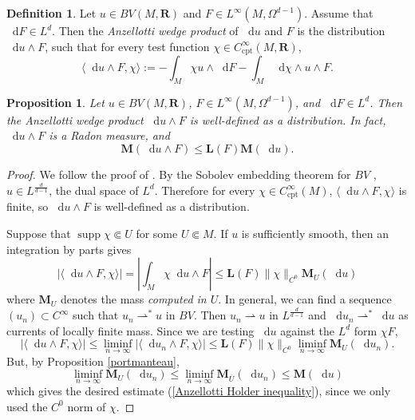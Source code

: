 \documentclass[reqno,11pt]{amsart}
\newcommand{\RR}{\mathbf{R}}
\newcommand*\dif{\mathop{}\!\mathrm{d}}
\DeclareMathOperator{\supp}{supp}
\newcommand{\weakto}{\rightharpoonup}
\newcommand{\Mass}{\mathbf M}
\newcommand{\Comass}{\mathbf L}
\newcommand{\dfn}[1]{\emph{#1}\index{#1}}
\newcommand{\cpt}{\mathrm{cpt}}
\newtheorem{proposition}[theorem]{Proposition}
\theoremstyle{definition}
\newtheorem{definition}[theorem]{Definition}
\numberwithin{equation}{section}
\begin{document}
\begin{definition}
Let $u \in BV(M, \RR)$ and $F \in L^\infty(M, \Omega^{d - 1})$.
Assume that $\dif F \in L^d$.
Then the \dfn{Anzellotti wedge product} of $\dif u$ and $F$ is the distribution $\dif u \wedge F$, such that for every test function $\chi \in C^\infty_\cpt(M, \RR)$,
$$\langle \dif u \wedge F, \chi\rangle := -\int_M \chi u \wedge \dif F - \int_M \dif \chi \wedge u \wedge F.$$
\end{definition}

\begin{proposition}\label{Anzellotti wedge product exists}
Let $u \in BV(M, \RR)$, $F \in L^\infty(M, \Omega^{d - 1})$, and $\dif F \in L^d$.
Then the Anzellotti wedge product $\dif u \wedge F$ is well-defined as a distribution.
In fact, $\dif u \wedge F$ is a Radon measure, and 
\begin{equation}\label{Anzellotti Holder inequality}
\Mass(\dif u \wedge F) \leq \Comass(F) \Mass(\dif u).
\end{equation}
\end{proposition}
\begin{proof}
We follow the proof of \cite[Theorem 1.5]{Anzellotti1983}.
By the Sobolev embedding theorem for $BV$ \cite[\S5.6]{evans2015measure}, $u \in L^{\frac{d}{d - 1}}$, the dual space of $L^d$.
Therefore for every $\chi \in C^\infty_\cpt(M)$, $\langle \dif u \wedge F, \chi\rangle$ is finite, so $\dif u \wedge F$ is well-defined as a distribution.

Suppose that $\supp \chi \Subset U$ for some $U \Subset M$.
If $u$ is sufficiently smooth, then an integration by parts gives 
$$|\langle \dif u \wedge F, \chi\rangle| = \left|\int_M \chi \dif u \wedge F\right| \leq \Comass(F) \|\chi\|_{C^0} \Mass_U(\dif u)$$
where $\Mass_U$ denotes the mass \emph{computed in $U$}.
In general, we can find a sequence $(u_n) \subset C^\infty$ such that $u_n \weakto^* u$ in $BV$.
Then $u_n \weakto u$ in $L^{\frac{d}{d - 1}}$ and $\dif u_n \weakto^* \dif u$ as currents of locally finite mass.
Since we are testing $\dif u$ against the $L^d$ form $\chi F$,
$$|\langle \dif u \wedge F, \chi\rangle| \leq \liminf_{n \to \infty} |\langle \dif u_n \wedge F, \chi\rangle| \leq \Comass(F) \|\chi\|_{C^0} \liminf_{n \to \infty} \Mass_U(\dif u_n).$$
But, by Proposition \ref{portmanteau},
$$\liminf_{n \to \infty} \Mass_U(\dif u_n) \leq \liminf_{n \to \infty} \Mass_{\overline U}(\dif u_n) \leq \Mass(\dif u)$$
which gives the desired estimate (\ref{Anzellotti Holder inequality}), since we only used the $C^0$ norm of $\chi$.
\end{proof}
\end{document}
